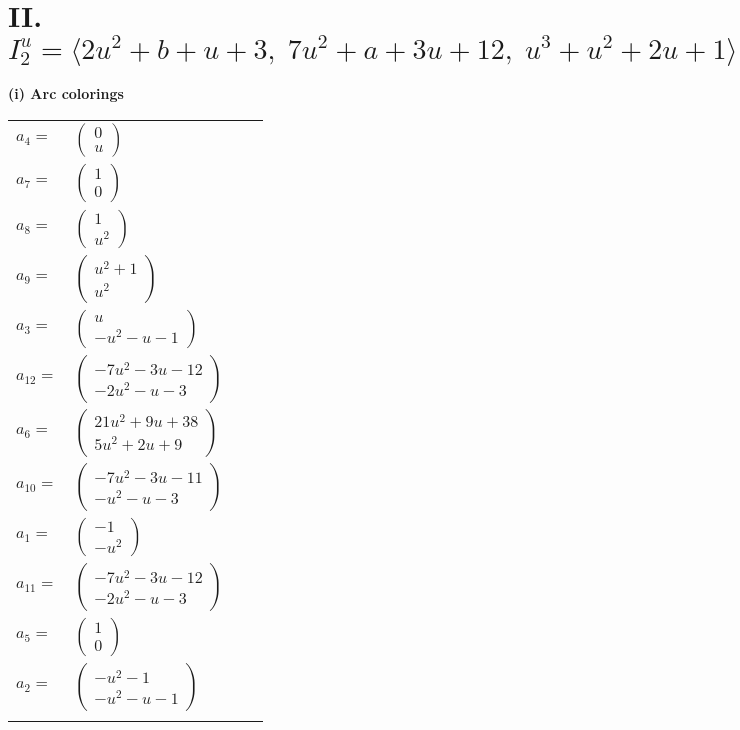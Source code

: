 \documentclass[1p]{elsarticle_modified}
\theoremstyle{definition}
\begin{document}
\centering \section*{II. $I^u_{2}= \langle 2 u^2+b+u+3,\;7 u^2+a+3 u+12,\;u^3+u^2+2 u+1 \rangle$}
\flushleft \textbf{(i) Arc colorings}\\
\begin{tabular}{m{7pt} m{180pt} m{7pt} m{180pt} }
\flushright $a_{4}=$&$\begin{pmatrix}0\\u\end{pmatrix}$ \\
\flushright $a_{7}=$&$\begin{pmatrix}1\\0\end{pmatrix}$ \\
\flushright $a_{8}=$&$\begin{pmatrix}1\\u^2\end{pmatrix}$ \\
\flushright $a_{9}=$&$\begin{pmatrix}u^2+1\\u^2\end{pmatrix}$ \\
\flushright $a_{3}=$&$\begin{pmatrix}u\\- u^2- u-1\end{pmatrix}$ \\
\flushright $a_{12}=$&$\begin{pmatrix}-7 u^2-3 u-12\\-2 u^2- u-3\end{pmatrix}$ \\
\flushright $a_{6}=$&$\begin{pmatrix}21 u^2+9 u+38\\5 u^2+2 u+9\end{pmatrix}$ \\
\flushright $a_{10}=$&$\begin{pmatrix}-7 u^2-3 u-11\\- u^2- u-3\end{pmatrix}$ \\
\flushright $a_{1}=$&$\begin{pmatrix}-1\\- u^2\end{pmatrix}$ \\
\flushright $a_{11}=$&$\begin{pmatrix}-7 u^2-3 u-12\\-2 u^2- u-3\end{pmatrix}$ \\
\flushright $a_{5}=$&$\begin{pmatrix}1\\0\end{pmatrix}$ \\
\flushright $a_{2}=$&$\begin{pmatrix}- u^2-1\\- u^2- u-1\end{pmatrix}$\\&\end{tabular}
\end{document}
